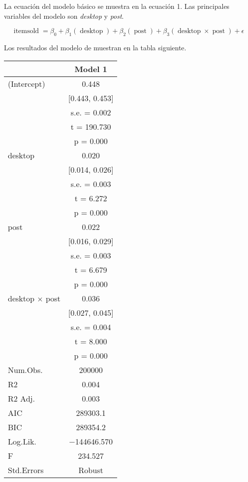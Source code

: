 \documentclass[
  12pt]{article}
\begin{document}
La ecuación del modelo básico se muestra en la ecuación 1. Las principales variables del modelo son \emph{desktop} y \emph{post}.

\begin{equation}
\operatorname{itemsold} = \beta_{0} + \beta_{1}(\operatorname{desktop}) + \beta_{2}(\operatorname{post}) + \beta_{3}(\operatorname{desktop} \times \operatorname{post}) + \epsilon
\end{equation}

Los resultados del modelo de muestran en la tabla siguiente.

\begin{table}[H]
\centering
\begin{tabular}[t]{lc}
\toprule
  & Model 1\\
\midrule
(Intercept) & \num{0.448}\\
 & {}[\num{0.443}, \num{0.453}]\\
 & s.e. = \num{0.002}\\
 & t = \num{190.730}\\
 & p = \vphantom{3} \num{0.000}\\
desktop & \num{0.020}\\
 & {}[\num{0.014}, \num{0.026}]\\
 & s.e. = \vphantom{1} \num{0.003}\\
 & t = \num{6.272}\\
 & p = \vphantom{2} \num{0.000}\\
post & \num{0.022}\\
 & {}[\num{0.016}, \num{0.029}]\\
 & s.e. = \num{0.003}\\
 & t = \num{6.679}\\
 & p = \vphantom{1} \num{0.000}\\
desktop × post & \num{0.036}\\
 & {}[\num{0.027}, \num{0.045}]\\
 & s.e. = \num{0.004}\\
 & t = \num{8.000}\\
 & p = \num{0.000}\\
\midrule
Num.Obs. & \num{200000}\\
R2 & \num{0.004}\\
R2 Adj. & \num{0.003}\\
AIC & \num{289303.1}\\
BIC & \num{289354.2}\\
Log.Lik. & \num{-144646.570}\\
F & \num{234.527}\\
Std.Errors & Robust\\
\bottomrule
\end{tabular}
\end{table}
\end{document}
